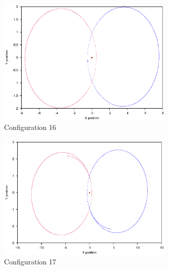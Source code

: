\documentclass[a4paper,12pt]{article}
\begin{document}
\begin{figure}[H]
\centering
\includegraphics[width=0.75\textwidth]{./results/07-1-07-15/Orbit.eps}
\caption{Configuration 16}
\label{fig:config16}
\end{figure}
\begin{figure}[H]
\centering
\includegraphics[width=0.75\textwidth]{./results/08-105-08-12/Orbit.eps}
\caption{Configuration 17}
\label{fig:config17}
\end{figure}
\end{document}
